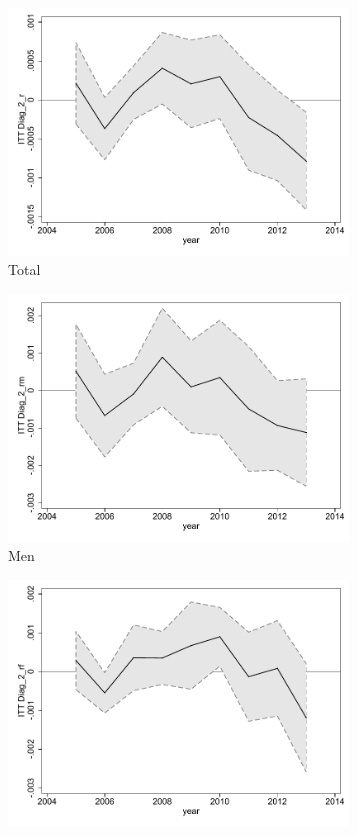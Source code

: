 \documentclass[a4paper ]{article}
\begin{document}
\begin{figure}[h!]
	\centering
	\begin{subfigure}[t]{0.31\textwidth}
		\centering
		\includegraphics[width=0.99\textwidth]{R1_LC_Diag_2_r}
		\caption{Total}		
	\end{subfigure}
	\begin{subfigure}[t]{0.31\textwidth}
		\centering
		\includegraphics[width=0.99\textwidth]{R1_LC_Diag_2_rm}
		\caption{Men}		
	\end{subfigure}
	\quad
	\begin{subfigure}[t]{0.31\textwidth}
		\centering
		\includegraphics[width=0.99\textwidth]{R1_LC_Diag_2_rf}

\end{subfigure}
\end{figure}
\end{document}
